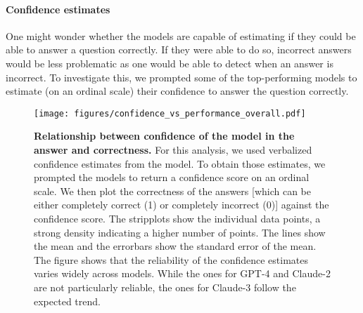 \documentclass[11pt, oneside]{article}
\begin{document}
\begin{refsection}
\clearpage

\paragraph{Confidence estimates} One might wonder whether the models are capable of estimating if they could be able to answer a question correctly. 
If they were able to do so, incorrect answers would be less problematic as one would be able to detect when an answer is incorrect.
To investigate this, we prompted\autocite{xiong2023llms} some of the top-performing models to estimate (on an ordinal scale) their confidence to answer the question correctly.

\begin{figure}[!h]
    \centering
    \texttt{[image: figures/confidence\_vs\_performance\_overall.pdf]}
    \caption{\textbf{Relationship between confidence of the model in the answer and correctness.} For this analysis, we used verbalized confidence estimates from the model. To obtain those estimates, we prompted the models to return a confidence score on an ordinal scale. We then plot the correctness of the answers [which can be either completely correct (1) or completely incorrect (0)] against the confidence score.
        The stripplots show the individual data points, a strong density indicating a higher number of points. The lines show the mean and the errorbars show the standard error of the mean. The figure shows that the reliability of the confidence estimates varies widely across models. While the ones for GPT-4 and Claude-2 are not particularly reliable, the ones for Claude-3 follow the expected trend.}
    \label{fig:confidence_vs_performance}
\end{figure}


\end{refsection}
\end{document}
